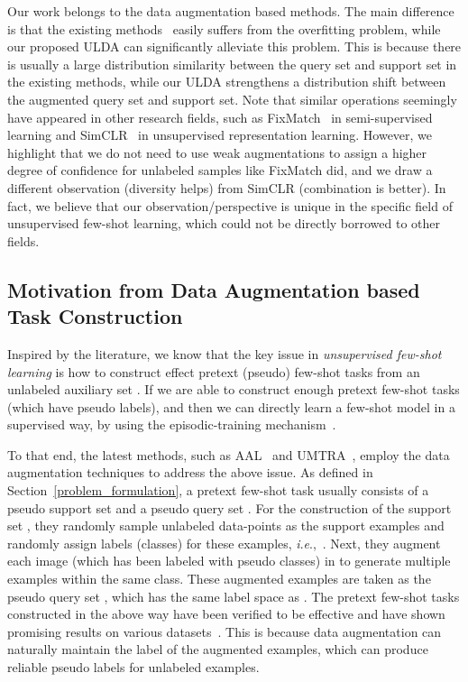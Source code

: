 \documentclass[letterpaper]{article} \usepackage{aaai21}  \usepackage{times}  \usepackage{helvet} \usepackage{courier}  \usepackage[hyphens]{url}  \usepackage{graphicx} \urlstyle{rm} \def\UrlFont{\rm}  \usepackage{natbib}  \usepackage{caption} \usepackage{url}
\newcommand{\ie}{\textit{i}.\textit{e}.,}
\begin{document}
Our work belongs to the data augmentation based methods. The main difference is that the existing methods~\cite{UMTRA2019NIPS,AAL2019ICML} easily suffers from the overfitting problem, while our proposed ULDA can significantly alleviate this problem. This is because there is usually a large distribution similarity between the query set and support set in the existing methods, while our ULDA strengthens a distribution shift between the augmented query set and support set. Note that similar operations seemingly have appeared in other research fields, such as FixMatch~\cite{Sohn2020FixMatch} in semi-supervised learning and SimCLR~\cite{Chen2020SimCLR} in unsupervised representation learning. However, we highlight that we do not need to use weak augmentations to assign a higher degree of confidence for unlabeled samples like FixMatch did, and we draw a different observation (diversity helps) from SimCLR (combination is better). In fact, we believe that our observation/perspective is unique in the specific field of unsupervised few-shot learning, which could not be directly borrowed to other fields.








\iffalse
\subsection{Motivation from Data Augmentation based Task Construction}

Inspired by the literature, we know that the key issue in \textit{unsupervised few-shot learning} is how to construct effect pretext (pseudo) few-shot tasks from an unlabeled auxiliary set . If we are able to construct enough pretext few-shot tasks (which have pseudo labels), and then we can directly learn a few-shot model in a supervised way, by using the episodic-training mechanism~\cite{Vinyals2016NIPS}.

To that end, the latest methods, such as AAL~\cite{AAL2019ICML} and UMTRA~\cite{UMTRA2019NIPS}, employ the data augmentation techniques to address the above issue. As defined in Section~\ref{problem_formulation}, a pretext few-shot task usually consists of a pseudo support set  and a pseudo query set . For the construction of the support set , they randomly sample  unlabeled data-points as the support examples and randomly assign  labels (classes) for these examples, \ie~. Next, they augment each image (which has been labeled with pseudo classes) in  to generate multiple examples within the same class. These augmented examples are taken as the pseudo query set , which has the same label space as . The pretext few-shot tasks constructed in the above way have been verified to be effective and have shown promising results on various datasets~\cite{AAL2019ICML,UMTRA2019NIPS}. This is because data augmentation can naturally maintain the label of the augmented examples, which can produce reliable pseudo labels for unlabeled examples.
\end{document}
